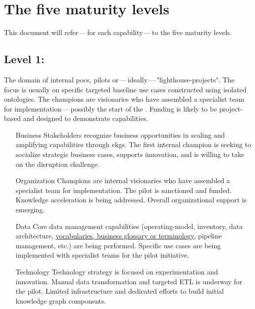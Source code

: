 \section{The five maturity levels}\label{sec:the-five-maturity-levels}

This document will refer\,---\,for each capability\,---\,to the five maturity levels.

\subsection{Level 1: \ekgmmLevelOneLabel}

The domain of internal \glspl{poc}, pilots or\,---\,ideally\,---\,"\glspl{lighthouse-project}".
The focus is usually on specific targeted baseline use cases constructed using isolated ontologies.
The champions are visionaries who have assembled a specialist team for implementation\,---\,possibly the
start of the .
Funding is likely to be project-based and designed to demonstrate capabilities.

\begin{itemize}[leftmargin=1in,font=\bfseries]

    \item[Business]     Stakeholders recognize business opportunities in scaling and amplifying capabilities
                        through \glspl{ekg}.
                        The first internal champion is seeking to socialize strategic business cases,
                        supports innovation, and is willing to take on the disruption challenge.
    \item[Organization] Champions are internal visionaries who have assembled a specialist team for implementation.
                        The pilot is sanctioned and funded.
                        Knowledge acceleration is being addressed.
                        Overall organizational support is emerging.
    \item[Data]         Core data management capabilities (\gls{operating-model}, inventory, data architecture,
                        \hyperref[sec:ekg-maturity-business-vocabularies]{vocabularies, business glossary or terminology},
                        pipeline management, etc.) are being performed.
                        Specific use cases are being implemented with specialist teams for the pilot initiative.
    \item[Technology]   Technology strategy is focused on experimentation and innovation.
                        Manual data transformation and targeted ETL is underway for the pilot.
                        Limited infrastructure and dedicated efforts to build initial knowledge graph components.
\end{itemize}

